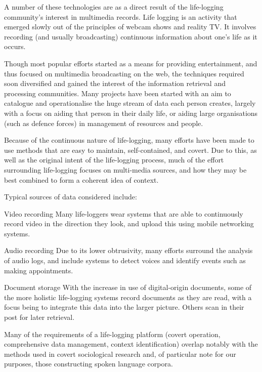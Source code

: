 A number of these technologies are as a direct result of the life-logging community's interest in multimedia records.  Life logging is an activity that emerged slowly out of the principles of webcam shows and reality TV.  It involves recording (and usually broadcasting) continuous information about one's life as it occurs.

Though most popular efforts started as a means for providing entertainment, and thus focused on multimedia broadcasting on the web, the techniques required soon diversified and gained the interest of the information retrieval and processing communities.  Many projects have been started with an aim to catalogue and operationalise the huge stream of data each person creates, largely with a focus on aiding that person in their daily life, or aiding large organisations (such as defence forces) in management of resources and people.


Because of the continuous nature of life-logging, many efforts have been made to use methods that are easy to maintain, self-contained, and covert.  %
Due to this, as well as the original intent of the life-logging process, much of the effort surrounding life-logging focuses on multi-media sources, and how they may be best combined to form a coherent idea of context.  

Typical sources of data considered include:

\begin{itemizeTitle}
    \item[Video recording] Many life-loggers wear systems that are able to continuously record video in the direction they look, and upload this using mobile networking systems.
    \item[Audio recording] Due to its lower obtrusivity, many efforts surround the analysis of audio logs, and include systems to detect voices and identify events such as making appointments.
    \item[Document storage] With the increase in use of digital-origin documents, some of the more holistic life-logging systems record documents as they are read, with a focus being to integrate this data into the larger picture.  Others scan in their post for later retrieval.
\end{itemizeTitle}

Many of the requirements of a life-logging platform (covert operation, comprehensive data management, context identification) overlap notably with the methods used in covert sociological research and, of particular note for our purposes, those constructing spoken language corpora.

